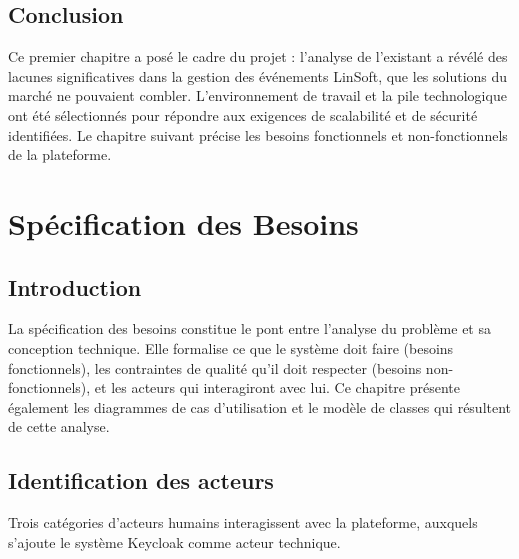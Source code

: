 \documentclass[12pt,a4paper]{report}
\begin{document}
\section*{Conclusion}

Ce premier chapitre a pos\'e le cadre du projet : l'analyse de l'existant a r\'ev\'el\'e des
lacunes significatives dans la gestion des \'ev\'enements LinSoft, que les solutions du march\'e
ne pouvaient combler. L'environnement de travail et la pile technologique ont \'et\'e
s\'electionn\'es pour r\'epondre aux exigences de scalabilit\'e et de s\'ecurit\'e identifi\'ees.
Le chapitre suivant pr\'ecise les besoins fonctionnels et non-fonctionnels de la plateforme.

\chapter{Sp\'ecification des Besoins}

\section*{Introduction}

La sp\'ecification des besoins constitue le pont entre l'analyse du probl\`eme et sa
conception technique. Elle formalise ce que le syst\`eme doit faire (besoins fonctionnels),
les contraintes de qualit\'e qu'il doit respecter (besoins non-fonctionnels), et les
acteurs qui interagiront avec lui. Ce chapitre pr\'esente \'egalement les diagrammes de
cas d'utilisation et le mod\`ele de classes qui r\'esultent de cette analyse.

\section{Identification des acteurs}

Trois cat\'egories d'acteurs humains interagissent avec la plateforme, auxquels s'ajoute
le syst\`eme Keycloak comme acteur technique.
\end{document}
